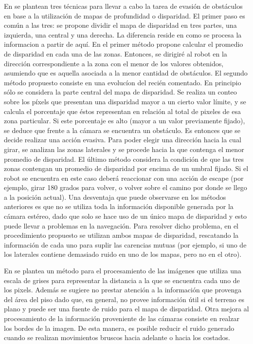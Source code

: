\documentclass[journal]{IEEEtran}
\begin{document}
En \cite{KNG10} se plantean tres t\'ecnicas para llevar a cabo la tarea de evasi\'on de obst\'aculos en base a la utilizaci\'on de mapas de profundidad o disparidad. El primer paso es com\'un a las tres: se propone dividir el mapa de disparidad en tres partes, una izquierda, una central y una derecha. La diferencia reside en como se procesa la informacion a partir de aqu\'i. En el primer m\'etodo propone calcular el promedio de disparidad en cada una de las zonas. Entonces, se dirigir\'e al robot en la direcci\'on correspondiente a la zona con el menor de los valores obtenidos, asumiendo que es aquella asociada a la menor cantidad de obst\'aculos. El segundo m\'etodo propuesto consiste en una evoluc\'ion del reci\'en comentado. En principio s\'olo se considera la parte central del mapa de disparidad. Se realiza un conteo sobre los p\'ixels que presentan una disparidad mayor a un cierto valor l\'imite, y se calcula el porcentaje que \'estos representan en relaci\'on al total de pixeles de esa zona particular. Si este porcentaje es alto (mayor a un valor previamente fijado), se deduce que frente a la c\'amara se encuentra un obst\'aculo. Es entonces que se decide realizar una acci\'on evasiva. Para poder elegir una direcci\'on hacia la cual girar, se analizan las zonas laterales y se procede hacia la que contenga el menor promedio de disparidad. El \'ultimo m\'etodo considera la condici\'on de que las tres zonas contengan un promedio de disparidad por encima de un umbral fijado. Si el robot se encuentra en este caso deber\'a reaccionar con una acci\'on de escape (por ejemplo, girar 180 grados para volver, o volver sobre el camino por donde se llego a la posici\'on actual). Una desventaja que puede observarse en los m\'etodos anteriores es que no se utiliza toda la informaci\'on disponible generada por la c\'amara est\'ereo, dado que solo se hace uso de un \'unico mapa de disparidad y esto puede llevar a problemas en la navegaci\'on. Para resolver dicho problema, en el procedimiento propuesto se utilizan ambos mapas de disparidad, rescatando la informaci\'on de cada uno para suplir las carencias mutuas (por ejemplo, si uno de los laterales contiene demasiado ruido en uno de los mapas, pero no en el otro).

En \cite{RH04} se plantea un m\'etodo para el procesamiento de las im\'agenes que utiliza una escala de grises para representar la distancia a la que se encuentra cada uno de los pixels. Adem\'as se sugiere no prestar atenci\'on a la informaci\'on que provenga del \'area del piso dado que, en general, no provee informaci\'on \'util si el terreno es plano y puede ser una fuente de ruido para el mapa de disparidad. Otra mejora al procesamiento de la informaci\'on proveniente de las c\'amaras consiste en realzar los bordes de la imagen. De esta manera, es posible reducir el ruido generado cuando se realizan movimientos bruscos hacia adelante o hacia los costados.
\end{document}

